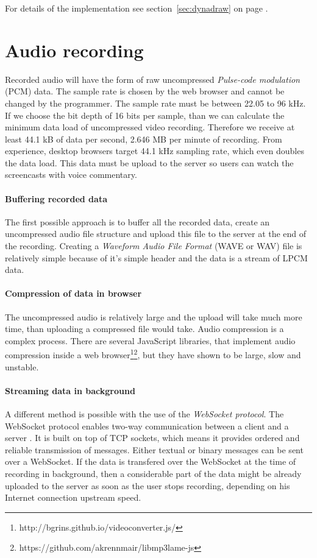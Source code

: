 For details of the implementation see section~\ref{sec:dynadraw} on page \pageref{sec:dynadraw}.



\section{Audio recording}
Recorded audio will have the form of raw uncompressed \textit{Pulse-code modulation} (PCM) data\cite{mic_pcm}. The sample rate is chosen by the web browser and cannot be changed by the programmer. The sample rate must be between 22.05 to 96 kHz. If we choose the bit depth of 16 bits per sample, than we can calculate the minimum data load of uncompressed video recording. Therefore we receive at least 44.1 kB of data per second, 2.646 MB per minute of recording. From experience, desktop browsers target 44.1 kHz sampling rate, which even doubles the data load. This data must be upload to the server so users can watch the screencasts with voice commentary.

\paragraph{Buffering recorded data} The first possible approach is to buffer all the recorded data, create an uncompressed audio file structure and upload this file to the server at the end of the recording. Creating a \textit{Waveform Audio File Format} (WAVE or WAV) file is relatively simple because of it's simple header and the data is a stream of LPCM data.

\paragraph{Compression of data in browser} The uncompressed audio is relatively large and the upload will take much more time, than uploading a compressed file would take. Audio compression is a complex process. There are several JavaScript libraries, that implement audio compression inside a web browser\footnote{http://bgrins.github.io/videoconverter.js/}\footnote{https://github.com/akrennmair/libmp3lame-js}, but they have shown to be large, slow and unstable.

\paragraph{Streaming data in background} A different method is possible with the use of the \textit{WebSocket protocol}. The WebSocket protocol enables two-way communication between a client and a server \cite{websocket}. It is built on top of TCP sockets, which means it provides ordered and reliable transmission of messages. Either textual or binary messages can be sent over a WebSocket. If the data is transfered over the WebSocket at the time of recording in background, then a considerable part of the data might be already uploaded to the server as soon as the user stops recording, depending on his Internet connection upstream speed.

